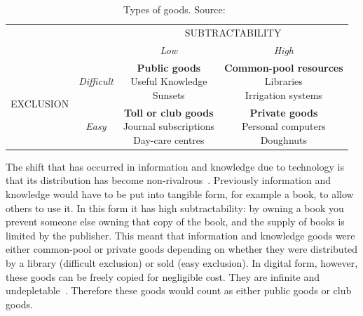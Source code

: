 \begin{table}
\centering
\caption[Types of goods]{Types of goods. Source:~\protect\citet{Hess2007}\label{table:goods}}
\begin{tabular}{c|c|c|c}
\multicolumn{2}{c|}{} & \multicolumn{2}{c}{SUBTRACTABILITY} \\
\cline{3-4}
\multicolumn{2}{c|}{} & \textit{Low} & \textit{High} \\
\hline
\multirow{2}{*}{\begin{sideways}EXCLUSION\end{sideways}} & \textit{Difficult} & \parbox{4cm}{\vspace{.3\baselineskip}\textbf{Public goods}\\
Useful Knowledge\\
Sunsets} & \parbox{4cm}{\vspace{.3\baselineskip}\textbf{Common-pool resources}\\
Libraries\\
Irrigation systems} \\[0.6cm]
 & \textit{Easy} & \parbox{4cm}{\vspace{.3\baselineskip}\textbf{Toll or club goods}\\
 Journal subscriptions\\
 Day-care centres} & \parbox{4cm}{\vspace{.3\baselineskip}\textbf{Private goods}\\
 Personal computers\\
 Doughnuts} \\[0.7cm]
\end{tabular}
\end{table}

The shift that has occurred in information and knowledge due to technology is that its distribution has become non-rivalrous~\citep{Ostrom2003,Bollier2007}.
Previously information and knowledge would have to be put into tangible form, for example a book, to allow others to use it. 
In this form it has high subtractability: by owning a book you prevent someone else owning that copy of the book, and the supply of books is limited by the publisher. 
This meant that information and knowledge goods were either common-pool or private goods depending on whether they were distributed by a library (difficult exclusion) or sold (easy exclusion). 
In digital form, however, these goods can be freely copied for negligible cost. 
They are infinite and undepletable~\citep{Bollier2007}. 
Therefore these goods would count as either public goods or club goods.

